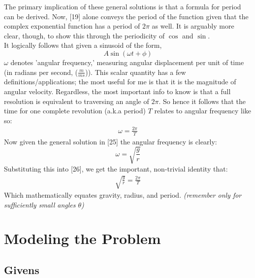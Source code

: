 \documentclass[11pt,a4paper]{article}
\begin{document}
The primary implication of these general solutions is that a formula for period can be derived.  Now,  [19] alone conveys the period of the function given that the complex exponential function has a period of $2\pi$ as well.  It is arguably more clear,  though,  to show this through the periodicity of $\cos$ and $\sin$.\\ It logically follows that given a sinusoid of the form,
\[A \sin ( \omega t + \phi )\]
$\omega$ denotes 'angular frequency,' measuring angular displacement per unit of time (in radians per second,  ($\frac{m}{ms}$)).  This scalar quantity has a few definitions/applications; the most useful for me is that it is the magnitude of angular velocity.  Regardless,  the most important info to know is that a full resolution is equivalent to traversing an angle of $2 \pi$.  So hence it follows that the time for one complete revolution (a.k.a period) $T$ relates to angular frequency like so:
\begin{align}
\omega = \frac{2\pi}{T}
\end{align}
Now given the general solution in [25] the angular frequency is clearly:
\[ \omega = \sqrt{\frac{g}{r}} \]
Substituting this into [26],  we get the important,  non-trivial identity that:
\begin{align}
\sqrt{\frac{g}{r}} =  \frac{2\pi}{T}
\end{align}
Which mathematically equates gravity,  radius, and period. \textit{(remember only for sufficiently small angles $\theta$)}



\section{Modeling the Problem}

\subsection{Givens}
\end{document}
